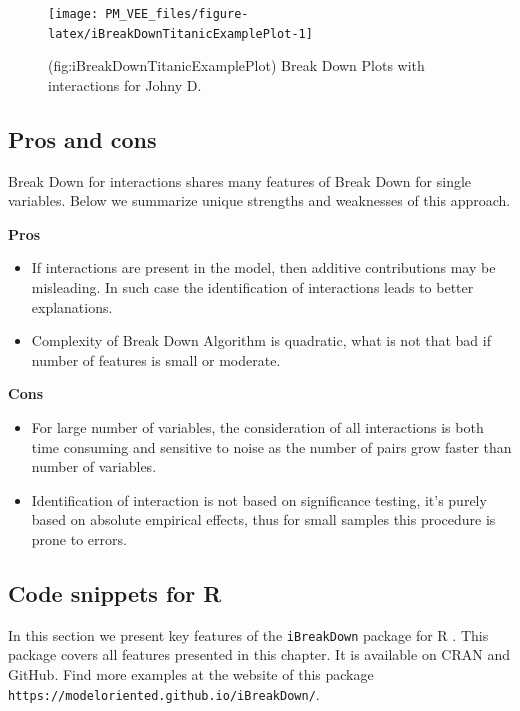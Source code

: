 \documentclass[12pt,]{krantz}
\providecommand{\tightlist}{%
  \setlength{\itemsep}{0pt}\setlength{\parskip}{0pt}}
\theoremstyle{definition}
\theoremstyle{definition}
\theoremstyle{definition}
\theoremstyle{remark}
\begin{document}
\begin{figure}

{\centering \texttt{[image: PM\_VEE\_files/figure-latex/iBreakDownTitanicExamplePlot-1]} 

}

\caption{(fig:iBreakDownTitanicExamplePlot) Break Down Plots with interactions for Johny D. }\label{fig:iBreakDownTitanicExamplePlot}
\end{figure}

\hypertarget{pros-and-cons-1}{%
\subsection{Pros and cons}\label{pros-and-cons-1}}

Break Down for interactions shares many features of Break Down for
single variables. Below we summarize unique strengths and weaknesses of
this approach.

\textbf{Pros}

\begin{itemize}
\tightlist
\item
  If interactions are present in the model, then additive contributions
  may be misleading. In such case the identification of interactions
  leads to better explanations.
\item
  Complexity of Break Down Algorithm is quadratic, what is not that bad
  if number of features is small or moderate.
\end{itemize}

\textbf{Cons}

\begin{itemize}
\tightlist
\item
  For large number of variables, the consideration of all interactions
  is both time consuming and sensitive to noise as the number of pairs
  grow faster than number of variables.
\item
  Identification of interaction is not based on significance testing,
  it's purely based on absolute empirical effects, thus for small
  samples this procedure is prone to errors.
\end{itemize}

\hypertarget{code-snippets-for-r-1}{%
\subsection{Code snippets for R}\label{code-snippets-for-r-1}}

In this section we present key features of the \texttt{iBreakDown}
package for R \citep{iBreakDownRPackage}. This package covers all
features presented in this chapter. It is available on CRAN and GitHub.
Find more examples at the website of this package
\texttt{https://modeloriented.github.io/iBreakDown/}.
\end{document}

